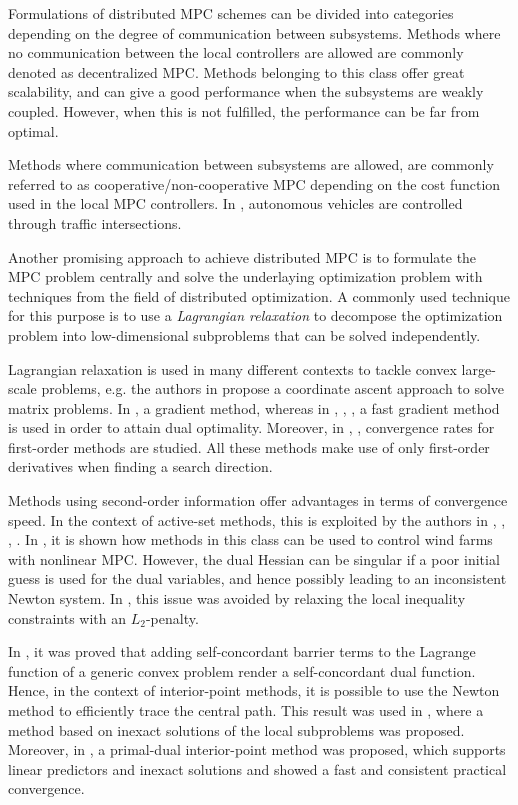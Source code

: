 Formulations of distributed MPC schemes can be divided into categories depending on the degree of communication between subsystems. Methods where no communication between the local controllers are allowed are commonly denoted as decentralized MPC. Methods belonging to this class offer great scalability, and can give a good performance when the subsystems are weakly coupled. However, when this is not fulfilled, the performance can be far from optimal. 

Methods where communication between subsystems are allowed, are commonly referred to as cooperative/non-cooperative MPC depending on the cost function used in the local MPC controllers. In \cite{Hult2015}, autonomous vehicles are controlled through traffic intersections.

Another promising approach to achieve distributed MPC is to formulate the MPC problem centrally and solve the underlaying optimization problem with techniques from the field of distributed optimization. A commonly used technique for this purpose is to use a \emph{Lagrangian relaxation} to decompose the optimization problem into low-dimensional subproblems that can be solved independently. 

Lagrangian relaxation is used in many different contexts to tackle convex large-scale problems, e.g. the authors in \cite{Cottle1986} propose a coordinate ascent approach to solve matrix problems. In \cite{Lasdon1970}, \cite{Giselsson2010} a gradient method, whereas in \cite{Richter2011}, \cite{Necoara2011}, \cite{Giselsson2013}, \cite{Giselsson2014a} a fast gradient method is used in order to attain dual optimality. Moreover, in \cite{Necoara2014a}, \cite{Necoara2014b}, convergence rates for first-order methods are studied. All these methods make use of only first-order derivatives when finding a search direction.

Methods using second-order information offer advantages in terms of convergence speed. In the context of active-set methods, this is exploited by the authors in \cite{Ferreau2012b}, \cite{Kozma2013a}, \cite{Kozma2014a}, \cite{Frasch2014}. In \cite{Gros2014a}, it is shown how methods in this class can be used to control wind farms with nonlinear MPC. However, the dual Hessian can be singular if a poor initial guess is used for the dual variables, and hence possibly leading to an inconsistent Newton system. In \cite{Kozma2014a}, this issue was avoided by relaxing the local inequality constraints with an $L_2$-penalty.

In \cite{Necoara2009a}, it was proved that adding self-concordant barrier terms to the Lagrange function of a generic convex problem render a self-concordant dual function. Hence, in the context of interior-point methods, it is possible to use the Newton method to efficiently trace the central path. This result was used in \cite{Quoc2013}, where a method based on inexact solutions of the local subproblems was proposed. Moreover, in \cite{Klintberg2014}, a primal-dual interior-point method was proposed, which supports linear predictors and inexact solutions and showed a fast and consistent practical convergence.

